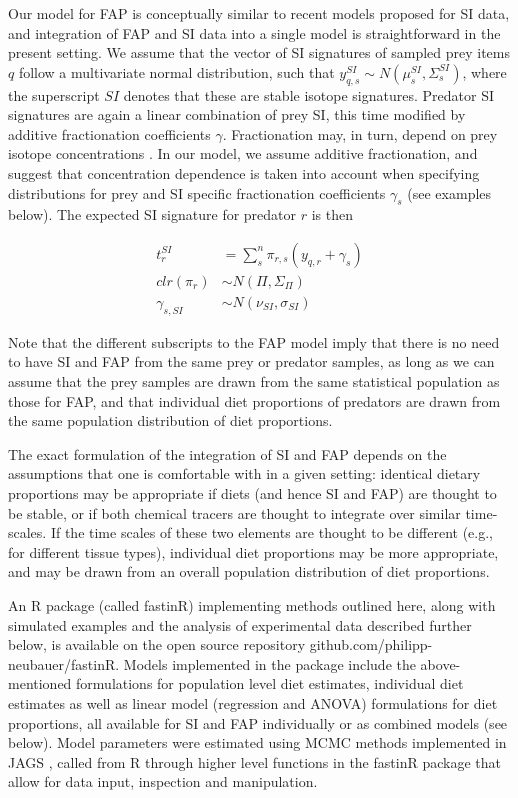 \documentclass{article}%
\begin{document}
\begin{spacing}{1.9}
\begin{flushleft}
Our model for FAP is conceptually similar to recent models proposed for SI data, and
integration of FAP and SI data into a single model is straightforward
in the present setting. We assume that the vector of SI signatures of
sampled prey
items $q$ follow a multivariate normal distribution, such that
$y_{q,s}^{SI} \sim N(\mu_s^{SI},\Sigma_s^{SI})$, where the superscript
$SI$ denotes that these are stable isotope signatures. Predator SI
signatures are again a linear combination of prey SI, this time
modified by additive fractionation coefficients
$\gamma$. Fractionation may, in turn, depend on prey isotope concentrations
\citep{hussey_rescaling_2014,caut_variation_2009}. In our model, we
assume additive fractionation, and suggest that concentration
dependence is taken into account when specifying distributions for
prey and SI specific fractionation coefficients $\gamma_s$ (see
examples below). The expected SI signature for predator $r$ is then

\begin{align}
\label{eq:3}
t_{r}^{SI} &=  \sum_{s}^n  \pi_{r,s}  \left(y_{q,r} + \gamma_{s} \right) \\
clr(\pi_{r}) &\sim N(\Pi,\Sigma_{\Pi})\\
\gamma_{s,SI} &\sim N(\nu_{SI},\sigma_{SI})
\end{align}


Note that the different subscripts to the FAP model imply that there is no need to have SI and
FAP from the same prey or predator samples, as long as we can assume that the prey samples are drawn
from the same statistical population as those for FAP, and that individual diet proportions of
predators are drawn from the same population distribution of diet
proportions.

The exact formulation of the integration of SI and FAP depends on the
assumptions that one is comfortable with in a given setting: identical
dietary proportions may be appropriate if diets (and hence SI and FAP)
are thought to be stable, or if both chemical tracers are thought to
integrate over similar time-scales. If the time scales of these two
elements are thought to be different (e.g., for different tissue
types), individual diet proportions may be more
appropriate, and may be drawn from an overall population distribution
of diet proportions. 


An R \citep{R_core_2014}
package (called fastinR) implementing methods outlined here, along with simulated
examples and the analysis of
experimental data described further below, is available on the
open source repository github.com/philipp-neubauer/fastinR. Models
implemented in the package include the above-mentioned formulations
for population level diet estimates, individual diet
estimates  as well as linear model
(regression and ANOVA) formulations for diet proportions, all
available for SI and FAP individually or as combined models (see
below). Model parameters were estimated using MCMC methods
implemented in JAGS \citep{plummer_jags_2003}, called
from R through higher level functions in the
fastinR package that allow for data input,
 inspection and manipulation.


\end{flushleft}
\end{spacing}
\end{document}
